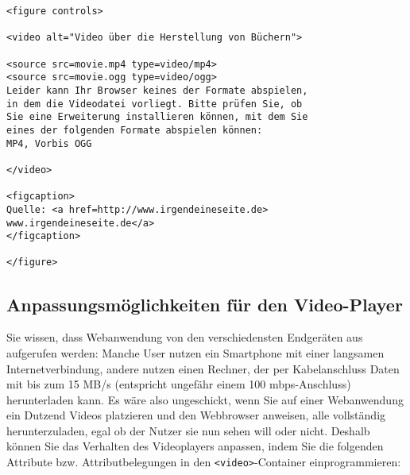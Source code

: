 \begin{verbatim}
<figure controls>

<video alt="Video über die Herstellung von Büchern">

<source src=movie.mp4 type=video/mp4>
<source src=movie.ogg type=video/ogg>
Leider kann Ihr Browser keines der Formate abspielen, 
in dem die Videodatei vorliegt. Bitte prüfen Sie, ob 
Sie eine Erweiterung installieren können, mit dem Sie 
eines der folgenden Formate abspielen können: 
MP4, Vorbis OGG

</video>

<figcaption>
Quelle: <a href=http://www.irgendeineseite.de>
www.irgendeineseite.de</a>
</figcaption>

</figure>
\end{verbatim}

\subsection{Anpassungsmöglichkeiten für den Video-Player}

Sie wissen, dass Webanwendung von den verschiedensten Endgeräten aus aufgerufen werden: Manche User nutzen ein Smartphone mit einer langsamen Internetverbindung, andere nutzen einen Rechner, der per Kabelanschluss Daten mit bis zum 15 MB/s (entspricht ungefähr einem 100 mbps-Anschluss) herunterladen kann. Es wäre also ungeschickt, wenn Sie auf einer Webanwendung ein Dutzend Videos platzieren und den Webbrowser anweisen, alle vollständig herunterzuladen, egal ob der Nutzer sie nun sehen will oder nicht. Deshalb können Sie das Verhalten des Videoplayers anpassen, indem Sie die folgenden Attribute bzw. Attributbelegungen in den \verb|<video>|-Container einprogrammieren:

